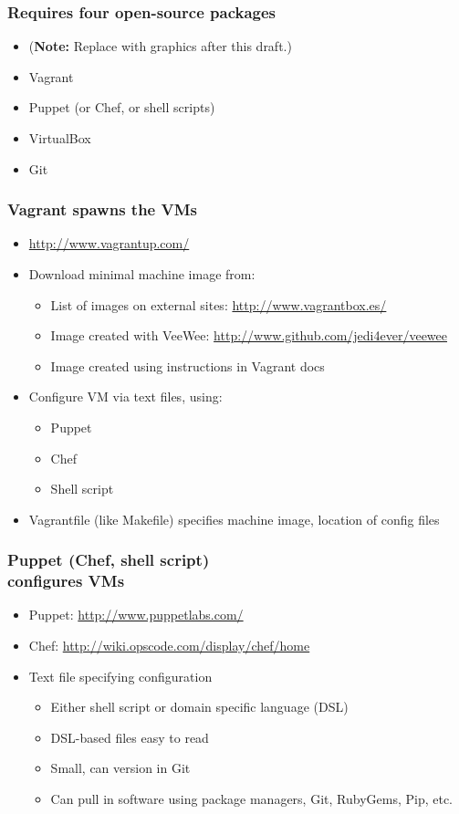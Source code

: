 \documentclass [14pt]{beamer}
\begin{document}
\begin{frame}
\frametitle{Requires four open-source packages}
\begin{itemize}
\item (\textbf{Note:} Replace with graphics after this draft.)
\item Vagrant
\item Puppet (or Chef, or shell scripts)
\item VirtualBox
\item Git
\end{itemize}
\end{frame}

\begin{frame}
\frametitle{Vagrant spawns the VMs}
\begin{itemize}
\item \url{http://www.vagrantup.com/}
\item Download minimal machine image from:
\begin{itemize}
\item List of images on external sites: \url{http://www.vagrantbox.es/}
\item Image created with VeeWee:
  \url{http://www.github.com/jedi4ever/veewee}
\item Image created using instructions in Vagrant docs
\end{itemize}
\item Configure VM via text files, using:
\begin{itemize}
\item Puppet
\item Chef
\item Shell script  
\end{itemize}
\item Vagrantfile (like Makefile) specifies machine image, location of config files
\end{itemize}
\end{frame}

\begin{frame}
\frametitle{Puppet (Chef, shell script)\\
configures VMs}
\begin{itemize}
\item Puppet: \url{http://www.puppetlabs.com/}
\item Chef: \url{http://wiki.opscode.com/display/chef/home}
\item Text file specifying configuration
\begin{itemize}
\item Either shell script or domain specific language (DSL)
\item DSL-based files easy to read
\item Small, can version in Git
\item Can pull in software using package managers, Git, RubyGems, Pip, etc.
\end{itemize}
\end{itemize}
\end{frame}
\end{document}
